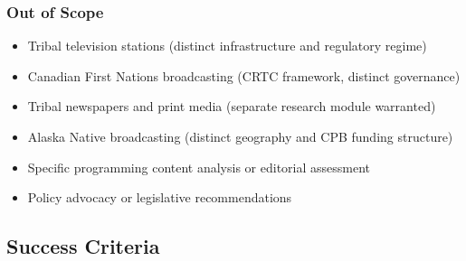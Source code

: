 \documentclass[11pt,letterpaper]{article}
\begin{document}
\subsubsection{Out of Scope}
\begin{itemize}[leftmargin=2em]
  \item Tribal television stations (distinct infrastructure and regulatory regime)
  \item Canadian First Nations broadcasting (CRTC framework, distinct governance)
  \item Tribal newspapers and print media (separate research module warranted)
  \item Alaska Native broadcasting (distinct geography and CPB funding structure)
  \item Specific programming content analysis or editorial assessment
  \item Policy advocacy or legislative recommendations
\end{itemize}

\subsection{Success Criteria}
\end{document}
